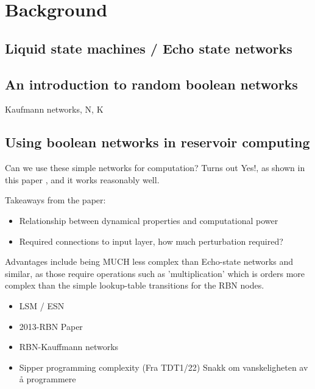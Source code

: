 \section{Background}

\subsection{Liquid state machines / Echo state networks}

\subsection{An introduction to random boolean networks}

Kaufmann networks, N, K

\subsection{Using boolean networks in reservoir computing}

Can we use these simple networks for computation?
Turns out Yes!, as shown in this paper \cite{rbn-reservoir}, and it works reasonably well.

Takeaways from the paper:
\begin{itemize}
  \item Relationship between dynamical properties and computational power
  \item Required connections to input layer, how much perturbation required?
\end{itemize}

Advantages include being MUCH less complex than Echo-state networks and similar, as those require operations such as 'multiplication' which is orders more complex than the simple lookup-table transitions for the RBN nodes.


\begin{itemize}
  \item LSM / ESN
  \item 2013-RBN Paper
  \item RBN-Kauffmann networks
  \item Sipper programming complexity (Fra TDT1/22) Snakk om vanskeligheten av å programmere
\end{itemize}
